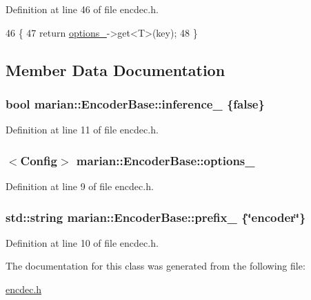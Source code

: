 Definition at line 46 of file encdec.\+h.


\begin{DoxyCode}
46                               \{
47     \textcolor{keywordflow}{return} \hyperlink{classmarian_1_1EncoderBase_a42fa90e65cd49dacccae154bf7873d97}{options\_}->get<T>(key);
48   \}
\end{DoxyCode}


\subsection{Member Data Documentation}
\subsubsection[{\texorpdfstring{inference\+\_\+}{inference_}}]{\setlength{\rightskip}{0pt plus 5cm}bool marian\+::\+Encoder\+Base\+::inference\+\_\+ \{false\}\hspace{0.3cm}{\ttfamily [protected]}}\hypertarget{classmarian_1_1EncoderBase_a3543e255f5547f556c6ba30220ee2f2c}{}\label{classmarian_1_1EncoderBase_a3543e255f5547f556c6ba30220ee2f2c}


Definition at line 11 of file encdec.\+h.

\subsubsection[{\texorpdfstring{options\+\_\+}{options_}}]{$<${\bf Config}$>$ marian\+::\+Encoder\+Base\+::options\+\_\+\hspace{0.3cm}{\ttfamily [protected]}}\hypertarget{classmarian_1_1EncoderBase_a42fa90e65cd49dacccae154bf7873d97}{}\label{classmarian_1_1EncoderBase_a42fa90e65cd49dacccae154bf7873d97}


Definition at line 9 of file encdec.\+h.

\subsubsection[{\texorpdfstring{prefix\+\_\+}{prefix_}}]{\setlength{\rightskip}{0pt plus 5cm}std\+::string marian\+::\+Encoder\+Base\+::prefix\+\_\+ \{\char`\"{}encoder\char`\"{}\}\hspace{0.3cm}{\ttfamily [protected]}}\hypertarget{classmarian_1_1EncoderBase_abbd764c19ebaae1d6e4ffec0c9930fba}{}\label{classmarian_1_1EncoderBase_abbd764c19ebaae1d6e4ffec0c9930fba}


Definition at line 10 of file encdec.\+h.



The documentation for this class was generated from the following file\+:\begin{DoxyCompactItemize}
\item 
\hyperlink{encdec_8h}{encdec.\+h}\end{DoxyCompactItemize}
